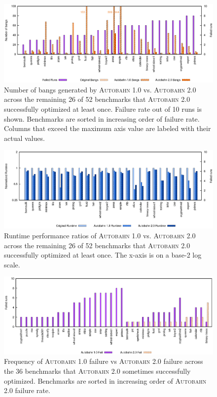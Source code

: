 \documentclass[format=sigplan, review=true, 9pt]{acmart}
\newcommand{\Ao}[0]{\textsc{Autobahn 1.0}}
\newcommand{\At}[0]{\textsc{Autobahn 2.0}}
\begin{document}
\begin{figure}
\includegraphics[width=\textwidth]{pap1-bangs}
\caption{Number of bangs generated by \Ao{} vs. \At{} across the
remaining 26 of 52 benchmarks that \At{} successfully optimized at least
once. Failure rate out of 10 runs is shown. Benchmarks are sorted in
increasing order of failure rate. Columns that exceed the maximum axis
value are labeled with their actual values. } 
\label{fig:2-bangs-52}
\end{figure}

\begin{figure}
\includegraphics[width=\textwidth]{pap1}
\caption{Runtime performance ratios of \Ao{} vs. \At{} across the
remaining 26 of 52 benchmarks that \At{} successfully optimized at least
once. The x-axis is on a base-2 log scale.
}
\label{fig:2-ratio-52}
\end{figure}

\begin{figure}
\includegraphics[width=\textwidth]{pap-fail}
\caption{Frequency of \Ao{} failure vs \At{} failure across the 36
benchmarks that \At{} sometimes successfully optimized. Benchmarks are sorted in
increasing order of \At{} failure rate. } 
\label{fig:2-failures}
\end{figure}
\end{document}

